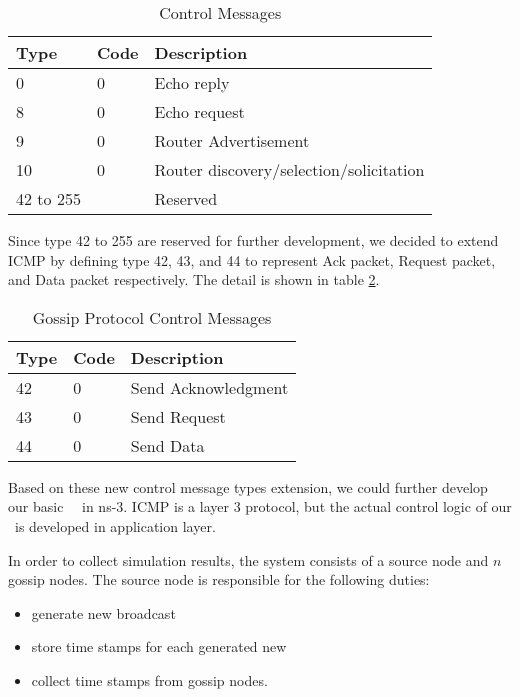 \begin{table}[h]
	\centering
	\caption{Control Messages}
	\label{table:2}
	\begin{tabular}{|p{1.5cm}|p{0.8 cm}|p{4.5 cm}|}
		\hline
		Type & Code & Description \\                                                           
		\hline
		0  & 0   & Echo reply   \\ \hline
		8  &  0 & Echo request \\ 
		\hline
		9 & 0 & Router Advertisement \\
		\hline
		10	& 0	&	Router discovery/selection/solicitation \\
		\hline
		42 to 255    &   & Reserved    \\ 
		\hline
	\end{tabular}
\end{table}

Since type 42 to 255 are reserved for further development, we decided to extend ICMP by defining type 42, 43, and 44 to represent Ack packet, Request packet, and Data packet respectively. The detail is shown in table \ref{table:3}.

\begin{table}[h]
	\centering
	\caption{Gossip Protocol Control Messages}
	\label{table:3}
	\begin{tabular}{|p{0.8cm}|p{0.5 cm}|p{3.5 cm}|}
		\hline
		Type & Code & Description \\                                                           
		\hline
		42  & 0   & Send Acknowledgment   \\ \hline
		43  &  0 & Send Request \\ 
		\hline
		44 & 0 & Send Data \\
		\hline
	\end{tabular}
\end{table}

Based on these new control message types extension, we could further develop our basic \pp  ~\gp ~in ns-3. ICMP is a layer 3 protocol, but the actual control logic of our \gp ~is developed in application layer. 

In order to collect simulation results, the system consists of a source node and $n$ gossip nodes. The source node is responsible for the following duties:

\begin{itemize}
	\item generate new broadcast \msgs
	\item store time stamps for each generated new \msgs
	\item collect time stamps from gossip nodes.
\end{itemize}

